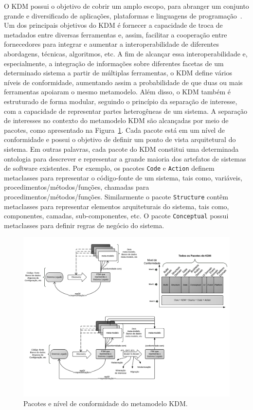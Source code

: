 \documentclass[12pt]{article}
\begin{document}
O KDM possui o objetivo de cobrir um amplo escopo, para abranger um conjunto grande e diversificado de aplicações, plataformas e linguagens de programação~\cite{KDM:specification, PerezCastillo:2011jo}. Um dos principais objetivos do KDM é fornecer a capacidade de troca de metadados entre diversas ferramentas e, assim, facilitar a cooperação entre fornecedores para integrar e aumentar a interoperabilidade de diferentes abordagens, técnicas, algoritmos, etc. A fim de alcançar essa interoperabilidade e, especialmente, a integração de informações sobre diferentes facetas de um determinado sistema a partir de múltiplas ferramentas, o KDM define vários níveis de conformidade, aumentando assim a probabilidade de que duas ou mais ferramentas apoiaram o mesmo metamodelo. Além disso, o KDM também é estruturado de forma modular, seguindo o princípio da separação de interesse, com a capacidade de representar partes heterogêneas de um sistema. A separação de interesses no contexto do metamodelo KDM são alcançadas por meio de pacotes, como apresentado na Figura~\ref{kdm:domain}. Cada pacote está em um nível de conformidade e possui o objetivo de definir um ponto de vista arquitetural do sistema. Em outras palavras, cada pacote do KDM constitui uma determinada ontologia para descrever e representar a grande maioria dos artefatos de sistemas de software existentes. Por exemplo, os pacotes \texttt{Code} e \texttt{Action} definem metaclasses para representar o código-fonte de um sistema, tais como, variáveis, procedimentos/métodos/funções, chamadas para procedimentos/métodos/funções. Similarmente o pacote \texttt{Structure} contêm metaclasses para representar elementos arquiteturais do sistema, tais como, componentes, camadas, sub-componentes, etc. O pacote \texttt{Conceptual} possui  metaclasses para definir regras de negócio do sistema.

\begin{figure}[htb]
 \centering
 \includegraphics[scale=1]{kdmLevels_pacotes.pdf}
 \caption{Pacotes e nível de conformidade do metamodelo KDM.}
 \label{kdm:domain}
\end{figure}
\end{document}

